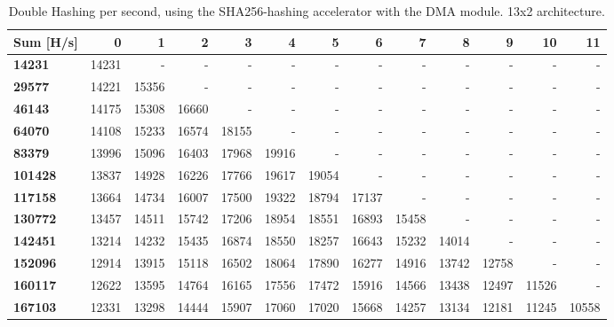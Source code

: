 \begin{appendix}
\begin{table}
\begin{tabular}{| l || r r r r r r r r r r r r |}
  \hline 
  \textbf{Sum} [H/s] & \textbf{0} & \textbf{1} & \textbf{2} & \textbf{3} & \textbf{4} & \textbf{5} & \textbf{6} & \textbf{7} & \textbf{8} & \textbf{9} & \textbf{10} & \textbf{11}\\
  \hline                       
  \textbf{14231} & 14231 & - & - & - & - & - & - & - & - & - & - & - \\
  \textbf{29577} & 14221 & 15356 & - & - & - & - & - & - & - & - & - & - \\
  \textbf{46143} & 14175 & 15308 & 16660 & - & - & - & - & - & - & - & - & - \\
  \textbf{64070} & 14108 & 15233 & 16574 & 18155 & - & - & - & - & - & - & - & - \\
  \textbf{83379} & 13996 & 15096 & 16403 & 17968 & 19916 & - & - & - & - & - & - & - \\
  \textbf{101428} & 13837 & 14928 & 16226 & 17766 & 19617 & 19054 & - & - & - & - & - & - \\
  \textbf{117158} & 13664 & 14734 & 16007 & 17500 & 19322 & 18794 & 17137 & - & - & - & - & - \\
  \textbf{130772} & 13457 & 14511 & 15742 & 17206 & 18954 & 18551 & 16893 & 15458 & - & - & - & -\\
  \textbf{142451} & 13214 & 14232 & 15435 & 16874 & 18550 & 18257 & 16643 & 15232 & 14014 & - & - & -\\
  \textbf{152096} & 12914 & 13915 & 15118 & 16502 & 18064 & 17890 & 16277 & 14916 & 13742 & 12758 & - & -\\
  \textbf{160117} & 12622 & 13595 & 14764 & 16165 & 17556 & 17472 & 15916 & 14566 & 13438 & 12497 & 11526 & -\\
  \textbf{167103} & 12331 & 13298 & 14444 & 15907 & 17060 & 17020 & 15668 & 14257 & 13134 & 12181 & 11245 & 10558\\
  \hline  
\end{tabular}
\caption{Double Hashing per second, using the SHA256-hashing accelerator with the DMA module. 13x2 architecture.}
\label{tab:Perf-SHADMA2}
\end{table}
		
		
			

\end{appendix}
